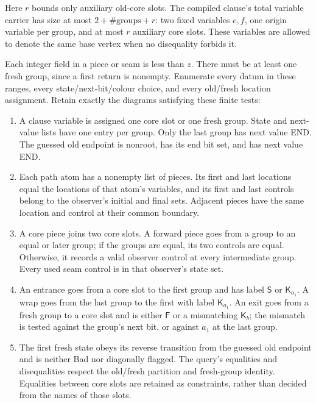 \documentclass[
  11pt,
  a4paper,
]{article}
\newcounter{none} %
\providecommand{\tightlist}{%
  \setlength{\itemsep}{0pt}\setlength{\parskip}{0pt}}
\begin{document}
Here \(r\) bounds only auxiliary old-core slots. The compiled clause's
total variable carrier has size at most \(2+\#\mathrm{groups}+r\): two
fixed variables \(e,f\), one origin variable per group, and at most
\(r\) auxiliary core slots. These variables are allowed to denote the
same base vertex when no disequality forbids it.

Each integer field in a piece or seam is less than \(z\). There must be
at least one fresh group, since a first return is nonempty. Enumerate
every datum in these ranges, every state/next-bit/colour choice, and
every old/fresh location assignment. Retain exactly the diagrams
satisfying these finite tests:

\begin{enumerate}
\def\labelenumi{\arabic{enumi}.}
\tightlist
\item
  A clause variable is assigned one core slot or one fresh group. State
  and next-value lists have one entry per group. Only the last group has
  next value END. The guessed old endpoint is nonroot, has its end bit
  set, and has next value END.
\item
  Each path atom has a nonempty list of pieces. Its first and last
  locations equal the locations of that atom's variables, and its first
  and last controls belong to the observer's initial and final sets.
  Adjacent pieces have the same location and control at their common
  boundary.
\item
  A core piece joins two core slots. A forward piece goes from a group
  to an equal or later group; if the groups are equal, its two controls
  are equal. Otherwise, it records a valid observer control at every
  intermediate group. Every used seam control is in that observer's
  state set.
\item
  An entrance goes from a core slot to the first group and has label
  \(\mathsf S\) or \(\mathsf K_{a_1}\). A wrap goes from the last group
  to the first with label \(\mathsf K_{a_1}\). An exit goes from a fresh
  group to a core slot and is either \(\mathsf F\) or a mismatching
  \(\mathsf K_b\); the mismatch is tested against the group's next bit,
  or against \(a_1\) at the last group.
\item
  The first fresh state obeys its reverse transition from the guessed
  old endpoint and is neither Bad nor diagonally flagged. The query's
  equalities and disequalities respect the old/fresh partition and
  fresh-group identity. Equalities between core slots are retained as
  constraints, rather than decided from the names of those slots.
\end{enumerate}
\end{document}
